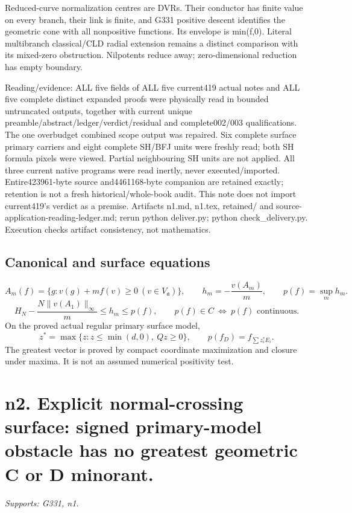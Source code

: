 \documentclass[11pt]{article}
\begin{document}
Reduced-curve normalization centres are DVRs. Their conductor has finite value on every branch, their link is finite, and G331 positive descent identifies the geometric cone with all nonpositive functions. Its envelope is min(f,0). Literal multibranch classical/CLD radial extension remains a distinct comparison with its mixed-zero obstruction. Nilpotents reduce away; zero-dimensional reduction has empty boundary.

Reading/evidence: ALL five fields of ALL five current419 actual notes and ALL five complete distinct expanded proofs were physically read in bounded untruncated outputs, together with current unique preamble/abstract/ledger/verdict/residual and complete002/003 qualifications. The one overbudget combined scope output was repaired. Six complete surface primary carriers and eight complete SH/BFJ units were freshly read; both SH formula pixels were viewed. Partial neighbouring SH units are not applied. All three current native programs were read inertly, never executed/imported. Entire423961-byte source and4461168-byte companion are retained exactly; retention is not a fresh historical/whole-book audit. This note does not import current419's verdict as a premise. Artifacts n1.md, n1.tex, retained/ and source-application-reading-ledger.md; rerun python deliver.py; python check\_delivery.py. Execution checks artifact consistency, not mathematics.

\subsection*{Canonical and surface equations}
\[
 A_m(f)=\{g:v(g)+mf(v)\ge0\ (v\in V_{\mathfrak a})\},\qquad
 h_m=-\frac{v(A_m)}m,\qquad p(f)=\sup_m h_m .
\]
\[
 H_N-\frac{N\|v(A_1)\|_\infty}{m}\le h_m\le p(f),\qquad
 p(f)\in C\ \Longleftrightarrow\ p(f)\text{ continuous}.
\]
On the proved actual regular primary surface model,
\[
 z^*=\max\{z:z\le\min(d,0),\ Qz\ge0\},\qquad
 p(f_D)=f_{\sum z_i^*E_i}.
\]
The greatest vector is proved by compact coordinate maximization and
closure under maxima. It is not an assumed numerical positivity test.


\section{n2. Explicit normal-crossing surface: signed primary-model obstacle has no greatest geometric C or D minorant.}
\textit{Supports: G331, n1.}
\end{document}
